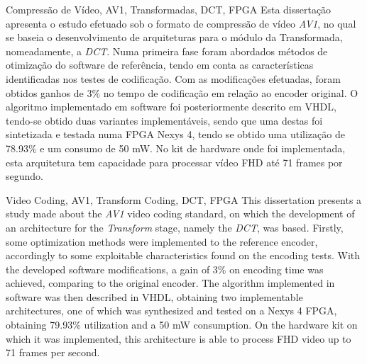 \TitlePage
  \vspace*{55mm}
       {Compressão de Vídeo, AV1, Transformadas, DCT, FPGA}
       {Esta dissertação apresenta o estudo efetuado sob o formato de compressão de vídeo \emph{AV1}, no qual se baseia o desenvolvimento de arquiteturas para o módulo da Transformada, nomeadamente, a \emph{DCT}. Numa primeira fase foram abordados métodos de otimização do software de referência, tendo em conta as características identificadas nos testes de codificação. Com as modificações efetuadas, foram obtidos ganhos de $3\%$ no tempo de codificação em relação ao encoder original.}
  \TEXT{}
       {O algoritmo implementado em software foi posteriormente descrito em VHDL, tendo-se obtido duas variantes implementáveis, sendo que uma destas foi sintetizada e testada numa FPGA Nexys 4, tendo se obtido uma utilização de 78.93\% e um consumo de 50 mW. No kit de hardware onde foi implementada, esta arquitetura tem capacidade para processar vídeo FHD até 71 frames por segundo.}
\EndTitlePage
\titlepage\ \endtitlepage %

\TitlePage
  \vspace*{55mm}
       {Video Coding, AV1, Transform Coding, DCT, FPGA}
       {This dissertation presents a study made about the \emph{AV1} video coding standard, on which the development of an architecture for the \emph{Transform} stage, namely the \emph{DCT}, was based. Firstly, some optimization methods were implemented to the reference encoder, accordingly to some exploitable characteristics found on the encoding tests. With the developed software modifications, a gain of $3\%$ on encoding time was achieved, comparing to the original encoder.}
  \TEXT{}
       {The algorithm implemented in software was then described in VHDL, obtaining two implementable architectures, one of which was synthesized and tested on a Nexys 4 FPGA, obtaining 79.93\% utilization and a 50 mW consumption. On the hardware kit on which it was implemented, this architecture is able to process FHD video up to 71 frames per second.}
\EndTitlePage
\titlepage\ \endtitlepage %
